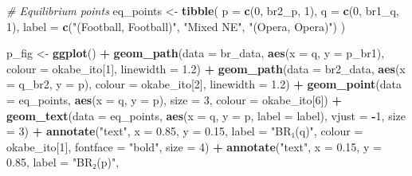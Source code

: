 \documentclass[
]{article}
\newenvironment{Shaded}{\begin{snugshade}}{\end{snugshade}}
\newcommand{\AttributeTok}[1]{\textcolor[rgb]{0.13,0.29,0.53}{#1}}
\newcommand{\CommentTok}[1]{\textcolor[rgb]{0.56,0.35,0.01}{\textit{#1}}}
\newcommand{\DecValTok}[1]{\textcolor[rgb]{0.00,0.00,0.81}{#1}}
\newcommand{\FloatTok}[1]{\textcolor[rgb]{0.00,0.00,0.81}{#1}}
\newcommand{\FunctionTok}[1]{\textcolor[rgb]{0.13,0.29,0.53}{\textbf{#1}}}
\newcommand{\NormalTok}[1]{#1}
\newcommand{\OtherTok}[1]{\textcolor[rgb]{0.56,0.35,0.01}{#1}}
\newcommand{\SpecialCharTok}[1]{\textcolor[rgb]{0.81,0.36,0.00}{\textbf{#1}}}
\newcommand{\StringTok}[1]{\textcolor[rgb]{0.31,0.60,0.02}{#1}}
\begin{document}
\begin{Shaded}
\begin{Highlighting}[]
\CommentTok{\# Equilibrium points}
\NormalTok{eq\_points }\OtherTok{\textless{}{-}} \FunctionTok{tibble}\NormalTok{(}
  \AttributeTok{p =} \FunctionTok{c}\NormalTok{(}\DecValTok{0}\NormalTok{, br2\_p, }\DecValTok{1}\NormalTok{),}
  \AttributeTok{q =} \FunctionTok{c}\NormalTok{(}\DecValTok{0}\NormalTok{, br1\_q, }\DecValTok{1}\NormalTok{),}
  \AttributeTok{label =} \FunctionTok{c}\NormalTok{(}\StringTok{"(Football, Football)"}\NormalTok{, }\StringTok{"Mixed NE"}\NormalTok{, }\StringTok{"(Opera, Opera)"}\NormalTok{)}
\NormalTok{)}

\NormalTok{p\_fig }\OtherTok{\textless{}{-}} \FunctionTok{ggplot}\NormalTok{() }\SpecialCharTok{+}
  \FunctionTok{geom\_path}\NormalTok{(}\AttributeTok{data =}\NormalTok{ br\_data, }\FunctionTok{aes}\NormalTok{(}\AttributeTok{x =}\NormalTok{ q, }\AttributeTok{y =}\NormalTok{ p\_br1),}
            \AttributeTok{colour =}\NormalTok{ okabe\_ito[}\DecValTok{1}\NormalTok{], }\AttributeTok{linewidth =} \FloatTok{1.2}\NormalTok{) }\SpecialCharTok{+}
  \FunctionTok{geom\_path}\NormalTok{(}\AttributeTok{data =}\NormalTok{ br2\_data, }\FunctionTok{aes}\NormalTok{(}\AttributeTok{x =}\NormalTok{ q\_br2, }\AttributeTok{y =}\NormalTok{ p),}
            \AttributeTok{colour =}\NormalTok{ okabe\_ito[}\DecValTok{2}\NormalTok{], }\AttributeTok{linewidth =} \FloatTok{1.2}\NormalTok{) }\SpecialCharTok{+}
  \FunctionTok{geom\_point}\NormalTok{(}\AttributeTok{data =}\NormalTok{ eq\_points, }\FunctionTok{aes}\NormalTok{(}\AttributeTok{x =}\NormalTok{ q, }\AttributeTok{y =}\NormalTok{ p),}
             \AttributeTok{size =} \DecValTok{3}\NormalTok{, }\AttributeTok{colour =}\NormalTok{ okabe\_ito[}\DecValTok{6}\NormalTok{]) }\SpecialCharTok{+}
  \FunctionTok{geom\_text}\NormalTok{(}\AttributeTok{data =}\NormalTok{ eq\_points, }\FunctionTok{aes}\NormalTok{(}\AttributeTok{x =}\NormalTok{ q, }\AttributeTok{y =}\NormalTok{ p, }\AttributeTok{label =}\NormalTok{ label),}
            \AttributeTok{vjust =} \SpecialCharTok{{-}}\DecValTok{1}\NormalTok{, }\AttributeTok{size =} \DecValTok{3}\NormalTok{) }\SpecialCharTok{+}
  \FunctionTok{annotate}\NormalTok{(}\StringTok{"text"}\NormalTok{, }\AttributeTok{x =} \FloatTok{0.85}\NormalTok{, }\AttributeTok{y =} \FloatTok{0.15}\NormalTok{, }\AttributeTok{label =} \StringTok{"BR₁(q)"}\NormalTok{,}
           \AttributeTok{colour =}\NormalTok{ okabe\_ito[}\DecValTok{1}\NormalTok{], }\AttributeTok{fontface =} \StringTok{"bold"}\NormalTok{, }\AttributeTok{size =} \DecValTok{4}\NormalTok{) }\SpecialCharTok{+}
  \FunctionTok{annotate}\NormalTok{(}\StringTok{"text"}\NormalTok{, }\AttributeTok{x =} \FloatTok{0.15}\NormalTok{, }\AttributeTok{y =} \FloatTok{0.85}\NormalTok{, }\AttributeTok{label =} \StringTok{"BR₂(p)"}\NormalTok{,}

\end{Highlighting}
\end{Shaded}
\end{document}
